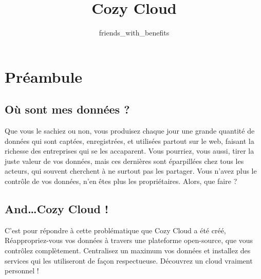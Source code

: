 \documentclass{42-fr}
\begin{document}
                           \title{Cozy Cloud}
                          \subtitle{friends\_with\_benefits}


\maketitle

\tableofcontents


\chapter{Préambule}


	\section{O\`u sont mes donn\'ees ?}

		Que vous le sachiez ou non, vous produisez chaque jour une grande quantit\'e de donn\'ees
		qui sont capt\'ees, enregistr\'ees, et utilis\'ees partout sur le web, faisant
		la richesse des entreprises qui se les accaparent. Vous pourriez, vous aussi,
		tirer la juste valeur de vos donn\'ees, mais ces derni\`eres sont \'eparpill\'ees
		chez tous les acteurs, qui souvent cherchent \`a ne surtout pas les partager.
		Vous n'avez plus le contrôle de vos donn\'ees, n'en \^etes plus les propri\'etaires.
		Alors, que faire ?


	\section{And…Cozy Cloud !}

		C'est pour r\'epondre \`a cette probl\'ematique que Cozy Cloud a \'et\'e  cr\'e\'e,
		R\'eappropriez-vous vos donn\'ees \`a travers une plateforme open-source, que vous contr\^olez
		compl\`etement. Centralisez un maximum vos donn\'ees et installez des services
		qui les utiliseront de façon respectueuse. D\'ecouvrez un cloud vraiment personnel !
\end{document}
